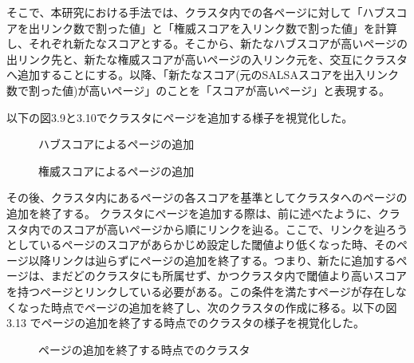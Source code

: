\documentclass[a4paper,11pt]{jreport}
\begin{document}
そこで、本研究における手法では、クラスタ内での各ページに対して「ハブスコアを出リンク数で割った値」と「権威スコアを入リンク数で割った値」を計算し、それぞれ新たなスコアとする。そこから、新たなハブスコアが高いページの出リンク先と、新たな権威スコアが高いページの入リンク元を、交互にクラスタへ追加することにする。以降、「新たなスコア(元のSALSAスコアを出入リンク数で割った値)が高いページ」のことを「スコアが高いページ」と表現する。

以下の図3.9と3.10でクラスタにページを追加する様子を視覚化した。

\begin{figure}[htbp]
\begin{center}
\end{center}
\caption{ハブスコアによるページの追加}
\label{figure:sample}
\end{figure}

\begin{figure}[htbp]
\begin{center}
\end{center}
\caption{権威スコアによるページの追加}
\label{figure:sample}
\end{figure}

その後、クラスタ内にあるページの各スコアを基準としてクラスタへのページの追加を終了する。
クラスタにページを追加する際は、前に述べたように、クラスタ内でのスコアが高いページから順にリンクを辿る。ここで、リンクを辿ろうとしているページのスコアがあらかじめ設定した閾値より低くなった時、そのページ以降リンクは辿らずにページの追加を終了する。つまり、新たに追加するページは、まだどのクラスタにも所属せず、かつクラスタ内で閾値より高いスコアを持つページとリンクしている必要がある。この条件を満たすページが存在しなくなった時点でページの追加を終了し、次のクラスタの作成に移る。以下の図3.13 でページの追加を終了する時点でのクラスタの様子を視覚化した。

\begin{figure}[htbp]
\begin{center}
\end{center}
\caption{ページの追加を終了する時点でのクラスタ}
\label{figure:sample}
\end{figure}
\end{document}
